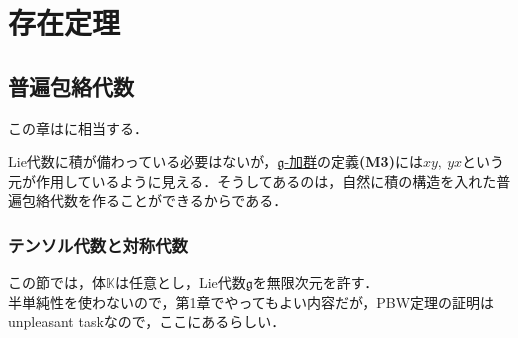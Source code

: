 \documentclass[rep_main]{subfiles}
\begin{document}
\setcounter{chapter}{4}
\chapter{存在定理}
\section{普遍包絡代数}

この章は\cite[Chapter V]{Humphreys1972introduction}に相当する．

Lie代数に積が備わっている必要はないが，\hyperref[ax:g-module]{$\mathfrak{g}$-加群}の定義\textbf{(M3)}には$xy,\ yx$という元が作用しているように見える．そうしてあるのは，自然に積の構造を入れた普遍包絡代数を作ることができるからである．

\subsection{テンソル代数と対称代数}
この節では，体$\mathbb{K}$は任意とし，Lie代数$\mathfrak{g}$を無限次元を許す．\\
半単純性を使わないので，第1章でやってもよい内容だが，PBW定理の証明はunpleasant taskなので，ここにあるらしい．
\end{document}
